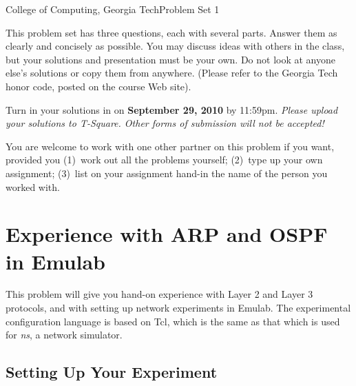 \documentclass[11pt]{article}
\begin{document}


{College of Computing, Georgia Tech}{Problem Set 1}


This problem set has three questions, each with several parts.  Answer
them as clearly and concisely as possible.  You may discuss ideas with
others in the class, but your solutions and presentation must be your
own.  Do not look at anyone else's solutions or copy them from
anywhere. (Please refer to the Georgia Tech honor code, posted on the
course Web site).

Turn in your solutions in on {\bf September 29, 2010} by 11:59pm.  {\em
  Please upload your solutions to T-Square.  Other forms of submission
  will not be accepted!}

You are welcome to work with one other partner on this problem if you
want, provided you (1)~work out all the problems yourself; (2)~type up
your own assignment; (3)~list on your assignment hand-in the name of the
person you worked with.

\section*{Experience with ARP and OSPF in Emulab}

This problem will give you hand-on experience with Layer 2 and Layer 3
protocols, and with setting up network experiments in Emulab.  The
experimental configuration language is based on Tcl, which is the same
as that which is used for {\em ns}, a network simulator.

\subsection*{Setting Up Your Experiment}
\end{document}
